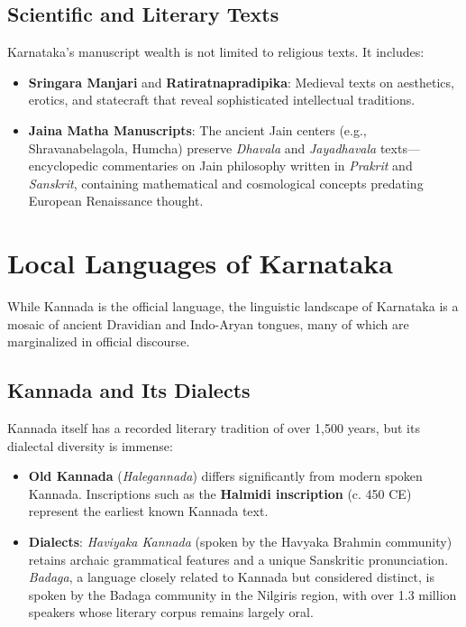\documentclass[12pt]{article}
\begin{document}
\subsection{Scientific and Literary Texts}
Karnataka’s manuscript wealth is not limited to religious texts. It includes:
\begin{itemize}
    \item \textbf{Sringara Manjari} and \textbf{Ratiratnapradipika}: Medieval texts on aesthetics, erotics, and statecraft that reveal sophisticated intellectual traditions.
    \item \textbf{Jaina Matha Manuscripts}: The ancient Jain centers (e.g., Shravanabelagola, Humcha) preserve \textit{Dhavala} and \textit{Jayadhavala} texts—encyclopedic commentaries on Jain philosophy written in \textit{Prakrit} and \textit{Sanskrit}, containing mathematical and cosmological concepts predating European Renaissance thought.
\end{itemize}
\begin{center}
\end{center}

\section{Local Languages of Karnataka}
While Kannada is the official language, the linguistic landscape of Karnataka is a mosaic of ancient Dravidian and Indo-Aryan tongues, many of which are marginalized in official discourse.

\subsection{Kannada and Its Dialects}
Kannada itself has a recorded literary tradition of over 1,500 years, but its dialectal diversity is immense:
\begin{itemize}
    \item \textbf{Old Kannada} (\textit{Halegannada}) differs significantly from modern spoken Kannada. Inscriptions such as the \textbf{Halmidi inscription} (c. 450 CE) represent the earliest known Kannada text.
    \item \textbf{Dialects}: \textit{Haviyaka Kannada} (spoken by the Havyaka Brahmin community) retains archaic grammatical features and a unique Sanskritic pronunciation. \textit{Badaga}, a language closely related to Kannada but considered distinct, is spoken by the Badaga community in the Nilgiris region, with over 1.3 million speakers whose literary corpus remains largely oral.
\end{itemize}
\end{document}
